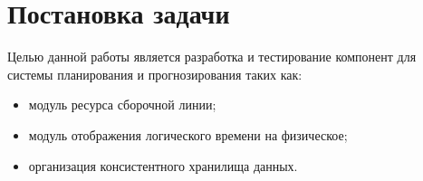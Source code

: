 \section{Постановка задачи}
Целью данной работы является разработка и тестирование компонент для системы планирования и прогнозирования таких как:
\begin{itemize}
	\item модуль ресурса сборочной линии;
	\item модуль отображения логического времени на физическое;
	\item организация консистентного хранилища данных.
\end{itemize}